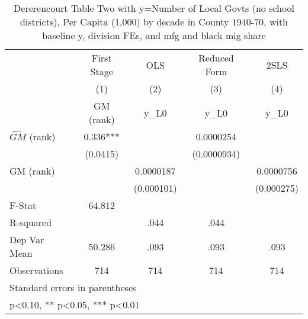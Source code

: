 \begin{table}[htbp]\centering
\def\sym#1{\ifmmode^{#1}\else\(^{#1}\)\fi}
\caption{Dererencourt Table Two with y=Number of Local Govts (no school districts), Per Capita (1,000) by decade in County 1940-70, with baseline y, division FEs, and mfg and black mig share}
\begin{tabular}{l*{4}{c}}
\toprule
                    & First Stage   &         OLS   &Reduced Form   &        2SLS   \\
                    &\multicolumn{1}{c}{(1)}&\multicolumn{1}{c}{(2)}&\multicolumn{1}{c}{(3)}&\multicolumn{1}{c}{(4)}\\
                    &\multicolumn{1}{c}{GM  (rank)}&\multicolumn{1}{c}{y\_L0}&\multicolumn{1}{c}{y\_L0}&\multicolumn{1}{c}{y\_L0}\\
\midrule
$\hat{GM}$ (rank)   &       0.336***&               &   0.0000254   &               \\
                    &    (0.0415)   &               & (0.0000934)   &               \\
\addlinespace
GM  (rank)          &               &   0.0000187   &               &   0.0000756   \\
                    &               &  (0.000101)   &               &  (0.000275)   \\
\midrule
F-Stat              &      64.812   &               &               &               \\
R-squared           &               &        .044   &        .044   &               \\
Dep Var Mean        &      50.286   &        .093   &        .093   &        .093   \\
Observations        &         714   &         714   &         714   &         714   \\
\bottomrule
\multicolumn{5}{l}{\footnotesize Standard errors in parentheses}\\
\multicolumn{5}{l}{\footnotesize * p<0.10, ** p<0.05, *** p<0.01}\\
\end{tabular}
\end{table}
